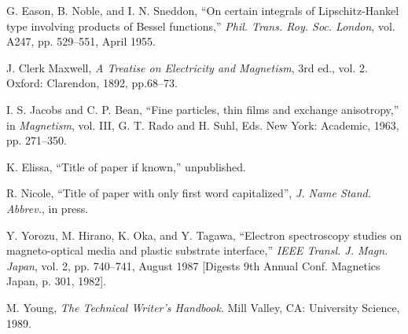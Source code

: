 %
%
%

\begin{thebibliography}{10}

 G. Eason, B. Noble, and I. N. Sneddon, ``On certain integrals of
Lipschitz-Hankel type involving products of Bessel functions,'' {\em Phil.
Trans. Roy. Soc. London}, vol. A247, pp. 529--551, April 1955.

 J. Clerk Maxwell, {\em A Treatise on Electricity and Magnetism}, 3rd ed.,
vol. 2. Oxford: Clarendon, 1892, pp.68--73.

 I. S. Jacobs and C. P. Bean, ``Fine particles, thin films and exchange
anisotropy,'' in {\em Magnetism}, vol. III, G. T. Rado and H. Suhl, Eds.
New York: Academic, 1963, pp. 271--350.

 K. Elissa, ``Title of paper if known,'' unpublished.

 R. Nicole, ``Title of paper with only first word capitalized'',
{\em J. Name Stand. Abbrev.}, in press.

 Y. Yorozu, M. Hirano, K. Oka, and Y. Tagawa, ``Electron spectroscopy
studies on magneto-optical media and plastic substrate interface,'' {\em
IEEE Transl. J. Magn. Japan}, vol. 2, pp. 740--741, August 1987 [Digests
9th Annual Conf. Magnetics Japan, p. 301, 1982].

 M. Young, {\em The Technical Writer's Handbook}. Mill Valley, CA: University
Science, 1989.


\end{thebibliography}



